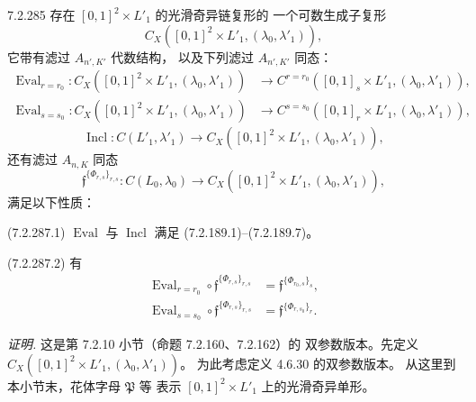 
\begin{lemma}{7.2.285}\label{lem:7-2-285}
存在 $[0,1]^2\times L'_1$ 的光滑奇异链复形的
一个可数生成子复形
\[
C_X([0,1]^2\times L'_1,(\lambda_0,\lambda'_1)),
\]
它带有滤过 $A_{n',K'}$ 代数结构，
以及下列滤过 $A_{n',K'}$ 同态：
\begin{equation}
\begin{aligned}
\operatorname{Eval}_{r=r_0}\colon
C_X([0,1]^2\times L'_1,(\lambda_0,\lambda'_1))
&\longrightarrow
C^{r=r_0}([0,1]_s\times L'_1,(\lambda_0,\lambda'_1)),\\
\operatorname{Eval}_{s=s_0}\colon
C_X([0,1]^2\times L'_1,(\lambda_0,\lambda'_1))
&\longrightarrow
C^{s=s_0}([0,1]_r\times L'_1,(\lambda_0,\lambda'_1)),
\end{aligned}
\tag{7.2.286.1}\label{eq:7-2-286-1}
\end{equation}
\begin{equation}
\operatorname{Incl}\colon C(L'_1,\lambda'_1)
\longrightarrow C_X([0,1]^2\times L'_1,(\lambda_0,\lambda'_1)),
\tag{7.2.286.2}\label{eq:7-2-286-2}
\end{equation}
还有滤过 $A_{n,K}$ 同态
\begin{equation}
\mathfrak f^{\{\Phi_{r,s}\}_{r,s}}\colon
C(L_0,\lambda_0)
\longrightarrow C_X([0,1]^2\times L'_1,(\lambda_0,\lambda'_1)),
\tag{7.2.286.3}\label{eq:7-2-286-3}
\end{equation}
满足以下性质：

\par\noindent\textup{(7.2.287.1)}
$\operatorname{Eval}$ 与 $\operatorname{Incl}$
满足 (7.2.189.1)--(7.2.189.7)。

\par\noindent\textup{(7.2.287.2)}
有
\[
\begin{aligned}
\operatorname{Eval}_{r=r_0}\circ
\mathfrak f^{\{\Phi_{r,s}\}_{r,s}}
&=\mathfrak f^{\{\Phi_{r_0,s}\}_s},\\
\operatorname{Eval}_{s=s_0}\circ
\mathfrak f^{\{\Phi_{r,s}\}_{r,s}}
&=\mathfrak f^{\{\Phi_{r,s_0}\}_r}.
\end{aligned}
\]
\end{lemma}

\par\noindent\textit{证明.}\quad
这是第 7.2.10 小节（命题 7.2.160、7.2.162）的
双参数版本。先定义
$C_X([0,1]^2\times L'_1,(\lambda_0,\lambda'_1))$。
为此考虑定义 4.6.30 的双参数版本。
从这里到本小节末，花体字母 $\mathfrak P$ 等
表示 $[0,1]^2\times L'_1$ 上的光滑奇异单形。

